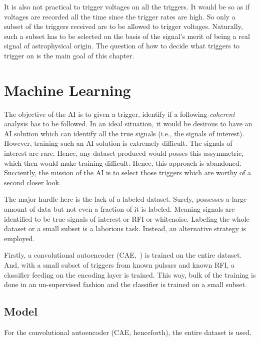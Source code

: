 \par It is also not practical to trigger voltages on all the triggers. It would be so as if voltages are recorded all the time since the trigger rates are high.
So only a subset of the triggers received are to be allowed to trigger voltages. 
Naturally, such a subset has to be selected on the basis of the signal's merit of being a real signal of astrophysical origin.
The question of how to decide what triggers to trigger on is the main goal of this chapter.

\section {Machine Learning}
\label{sec:ml}

\par The objective of the AI is to given a trigger, identify if a following \emph{coherent} analysis has to be followed.
In an ideal situation, it would be desirous to have an AI solution which can identify all the true signals (i.e., the signals of interest).
However, training such an AI solution is extremely difficult.
The signals of interest are rare. Hence, any dataset produced would posses this assymmetric, which then would make training difficult.
Hence, this approach is abandoned. 
Succiently, the mission of the AI is to select those triggers which are worthy of a second closer look.

\par The major hurdle here is the lack of a labeled dataset. 
Surely, \vfpfs possesses a large amount of data but not even a fraction of it is labeled.
Meaning signals are identified to be true signals of interest or RFI or whitenoise.
Labeling the whole dataset or a small subset is a laborious task.
Instead, an alternative strategy is employed.

Firstly, a convolutional autoencoder (CAE,~\cite{cae}) is trained on the entire dataset. 
And, with a small subset of triggers from known pulsars and known RFI, a classifier feeding on the encoding layer is trained.
This way, bulk of the training is done in an un-supervised fashion and the classifier is trained on a small subset.

\subsection{Model}
\label{ssub:mlmode}
\par For the convolutional autoencoder (CAE, henceforth), the entire dataset is used.


